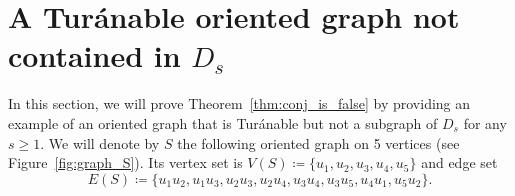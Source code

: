 \documentclass[11pt]{amsart}
\begin{document}
\section{A Tur\'anable oriented graph not contained in $D_s$} \label{sec:conj_is_false}

In this section, we will prove Theorem~\ref{thm:conj_is_false} by providing an example of an oriented graph that is Tur\'anable but not a subgraph of $D_s$ for any $s\ge 1$. We will denote by $S$ the following oriented graph on 5 vertices (see Figure~\ref{fig:graph_S}). Its vertex set is $V(S) \coloneqq \{u_1, u_2, u_3, u_4, u_5 \}$ and edge set 
\begin{equation}
    E(S) \coloneqq \{ u_1u_2, u_1u_3, u_2u_3, u_2u_4, u_3u_4, u_3u_5, u_4u_1, u_5u_2 \} .
\end{equation}
\end{document}
